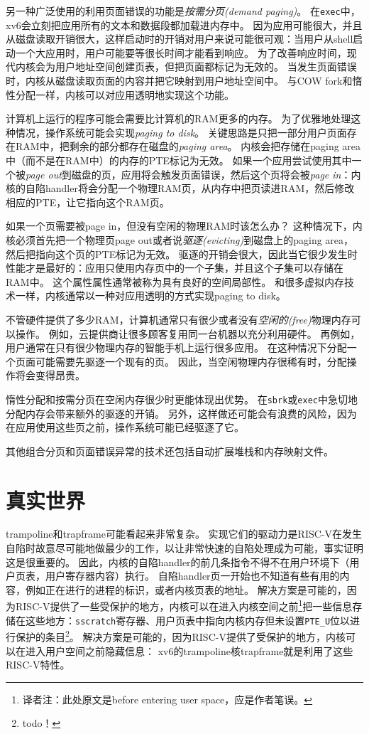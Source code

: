 另一种广泛使用的利用页面错误的功能是\emph{按需分页(demand paging)}。
在\texttt{exec}中，xv6会立刻把应用所有的文本和数据段都加载进内存中。
因为应用可能很大，并且从磁盘读取开销很大，这样启动时的开销对用户来说可能很可观：当用户从shell启动一个大应用时，用户可能要等很长时间才能看到响应。
为了改善响应时间，现代内核会为用户地址空间创建页表，但把页面都标记为无效的。
当发生页面错误时，内核从磁盘读取页面的内容并把它映射到用户地址空间中。
与COW fork和惰性分配一样，内核可以对应用透明地实现这个功能。

计算机上运行的程序可能会需要比计算机的RAM更多的内存。
为了优雅地处理这种情况，操作系统可能会实现\emph{paging to disk}。
关键思路是只把一部分用户页面存在RAM中，把剩余的部分都存在磁盘的\emph{paging area}。
内核会把存储在paging area中（而不是在RAM中）的内存的PTE标记为无效。
如果一个应用尝试使用其中一个被\emph{page out}到磁盘的页，应用将会触发页面错误，然后这个页将会被\emph{page in}：内核的自陷handler将会分配一个物理RAM页，从内存中把页读进RAM，然后修改相应的PTE，让它指向这个RAM页。

如果一个页需要被page in，但没有空闲的物理RAM时该怎么办？
这种情况下，内核必须首先把一个物理页page out或者说\emph{驱逐(evicting)}到磁盘上的paging area，然后把指向这个页的PTE标记为无效。
驱逐的开销会很大，因此当它很少发生时性能才是最好的：应用只使用内存页中的一个子集，并且这个子集可以存储在RAM中。
这个属性属性通常被称为具有良好的空间局部性。
和很多虚拟内存技术一样，内核通常以一种对应用透明的方式实现paging to disk。

不管硬件提供了多少RAM，计算机通常只有很少或者没有\emph{空闲的(free)}物理内存可以操作。
例如，云提供商让很多顾客复用同一台机器以充分利用硬件。
再例如，用户通常在只有很少物理内存的智能手机上运行很多应用。
在这种情况下分配一个页面可能需要先驱逐一个现有的页。
因此，当空闲物理内存很稀有时，分配操作将会变得昂贵。

惰性分配和按需分页在空闲内存很少时更能体现出优势。
在\texttt{sbrk}或\texttt{exec}中急切地分配内存会带来额外的驱逐的开销。
另外，这样做还可能会有浪费的风险，因为在应用使用这些页之前，操作系统可能已经驱逐了它。

其他组合分页和页面错误异常的技术还包括自动扩展堆栈和内存映射文件。

\section{真实世界}
trampoline和trapframe可能看起来非常复杂。
实现它们的驱动力是RISC-V在发生自陷时故意尽可能地做最少的工作，以让非常快速的自陷处理成为可能，事实证明这是很重要的。
因此，内核的自陷handler的前几条指令不得不在用户环境下（用户页表，用户寄存器内容）执行。
自陷handler页一开始也不知道有些有用的内容，例如正在进行的进程的标识，或者内核页表的地址。
解决方案是可能的，因为RISC-V提供了一些受保护的地方，内核可以在进入内核空间之前\footnote{译者注：此处原文是before entering user space，应是作者笔误。}把一些信息存储在这些地方：\texttt{sscratch}寄存器、用户页表中指向内核内存但未设置\texttt{PTE\_U}位以进行保护的条目\footnote{todo！}。
解决方案是可能的，因为RISC-V提供了受保护的地方，内核可以在进入用户空间之前隐藏信息：
xv6的trampoline核trapframe就是利用了这些RISC-V特性。

